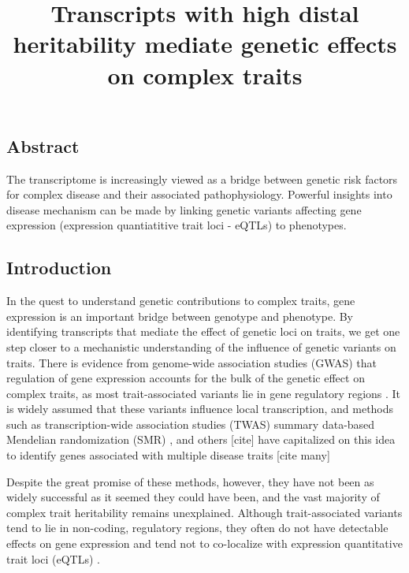 \documentclass[
]{article}
\title{Transcripts with high distal heritability mediate genetic effects
on complex traits}
\author{}
\date{\vspace{-2.5em}}
\begin{document}
\maketitle

\subsection{Abstract}\label{abstract}

The transcriptome is increasingly viewed as a bridge between genetic
risk factors for complex disease and their associated pathophysiology.
Powerful insights into disease mechanism can be made by linking genetic
variants affecting gene expression (expression quantiatitive trait loci
- eQTLs) to phenotypes.

\subsection{Introduction}\label{introduction}

In the quest to understand genetic contributions to complex traits, gene
expression is an important bridge between genotype and phenotype. By
identifying transcripts that mediate the effect of genetic loci on
traits, we get one step closer to a mechanistic understanding of the
influence of genetic variants on traits. There is evidence from
genome-wide association studies (GWAS) that regulation of gene
expression accounts for the bulk of the genetic effect on complex
traits, as most trait-associated variants lie in gene regulatory regions
\cite{pmid22955828, pmid25363779, pmid21617055, pmid19474294, 
pmid24702953, pmid24316577, pmid27126046}. It is widely assumed that
these variants influence local transcription, and methods such as
transcription-wide association studies (TWAS)
\cite{pmid33020666, pmid26258848, pmid27019110, pmid26854917} summary
data-based Mendelian randomization (SMR) \cite{pmid27019110}, and others
{[}cite{]} have capitalized on this idea to identify genes associated
with multiple disease traits {[}cite many{]}

Despite the great promise of these methods, however, they have not been
as widely successful as it seemed they could have been, and the vast
majority of complex trait heritability remains unexplained. Although
trait-associated variants tend to lie in non-coding, regulatory regions,
they often do not have detectable effects on gene expression
\cite{pmid32912663} and tend not to co-localize with expression
quantitative trait loci (eQTLs) \cite{pmid36515579, pmid37857933}.
\end{document}
